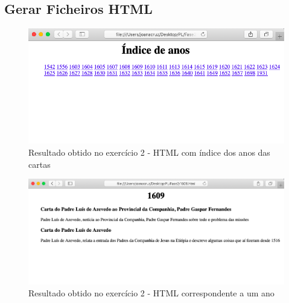 \documentclass[11pt,a4paper]{report}
\begin{document}
\subsection{Gerar Ficheiros HTML}
\begin{figure}[h]
\includegraphics[scale=0.50]{ex21}
\caption{Resultado obtido no exercício 2 - HTML com índice dos anos das cartas}
\end{figure}

\begin{figure}[h]
\includegraphics[width=\textwidth]{ex22}
\caption{Resultado obtido no exercício 2 - HTML correspondente a um ano}
\end{figure}

\newpage
\end{document}
